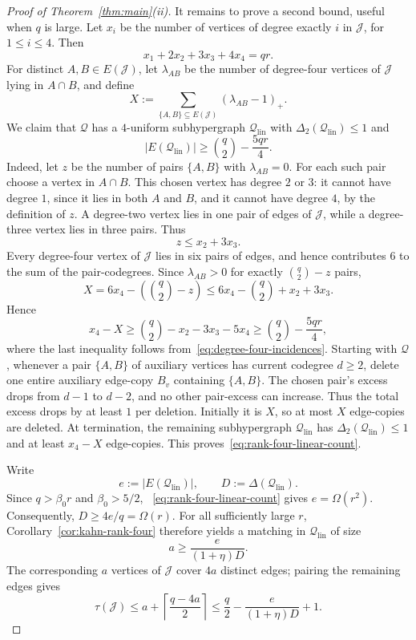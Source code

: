 \documentclass[10pt,a4paper]{amsart}
\newcommand{\Del}{\Delta}
\newcommand{\DelTwo}{\Delta_2}
\newcommand{\cJ}{\mathcal J}
\newcommand{\cQ}{\mathcal Q}
\newcommand{\cQlin}{\mathcal Q_{\mathrm{lin}}}
\newcommand{\ta}{\tau}
\begin{document}
\begin{proof}[Proof of Theorem~\ref{thm:main}(ii)]
It remains to prove a second bound, useful when $q$ is large.  Let $x_i$ be
the number of vertices of degree exactly $i$ in $\cJ$, for $1\le i\le 4$.
Then
\begin{equation}\label{eq:degree-four-incidences}
  x_1+2x_2+3x_3+4x_4=qr.
\end{equation}
For distinct $A,B\in E(\cJ)$, let $\lambda_{AB}$ be the number of
degree-four vertices of $\cJ$ lying in $A\cap B$, and define
\[
  X:=\sum_{\{A,B\}\subseteq E(\cJ)}(\lambda_{AB}-1)_+.
\]
We claim that $\cQ$ has a $4$-uniform subhypergraph $\cQlin$ with
$\DelTwo(\cQlin)\le 1$ and
\begin{equation}\label{eq:rank-four-linear-count}
  |E(\cQlin)|\ge \binom q2-\frac{5qr}{4}.
\end{equation}
Indeed, let $z$ be the number of pairs $\{A,B\}$ with $\lambda_{AB}=0$.
For each such pair choose a vertex in $A\cap B$.  This chosen vertex has
degree $2$ or $3$: it cannot have degree $1$, since it lies in both $A$ and
$B$, and it cannot have degree $4$, by the definition of $z$.  A degree-two
vertex lies in one pair of edges of $\cJ$, while a degree-three vertex lies in
three pairs.  Thus
\[
  z\le x_2+3x_3.
\]
Every degree-four vertex of $\cJ$ lies in six pairs of edges, and hence
contributes $6$ to the sum of the pair-codegrees.  Since $\lambda_{AB}>0$
for exactly $\binom q2-z$ pairs,
\[
  X
  =6x_4-\left(\binom q2-z\right)
  \le 6x_4-\binom q2+x_2+3x_3.
\]
Hence
\[
  x_4-X\ge \binom q2-x_2-3x_3-5x_4
  \ge \binom q2-\frac{5qr}{4},
\]
where the last inequality follows from~\eqref{eq:degree-four-incidences}.
Starting with $\cQ$, whenever a pair $\{A,B\}$ of auxiliary vertices has
current codegree $d\ge2$, delete one entire auxiliary edge-copy $B_v$
containing $\{A,B\}$.  The chosen pair's excess drops from $d-1$ to $d-2$,
and no other pair-excess can increase.  Thus the total excess drops by at
least $1$ per deletion.  Initially it is $X$, so at most $X$ edge-copies are
deleted.  At termination, the remaining subhypergraph $\cQlin$ has
$\DelTwo(\cQlin)\le1$ and at least $x_4-X$ edge-copies.  This
proves~\eqref{eq:rank-four-linear-count}.

Write
\[
  e:=|E(\cQlin)|,\qquad D:=\Del(\cQlin).
\]
Since $q>\beta_0r$ and $\beta_0>5/2$,
~\eqref{eq:rank-four-linear-count} gives $e=\Omega(r^2)$.
Consequently, $D\ge 4e/q=\Omega(r)$.  For all sufficiently large $r$,
Corollary~\ref{cor:kahn-rank-four} therefore yields a matching in $\cQlin$
of size
\[
  a\ge \frac{e}{(1+\eta)D}.
\]
The corresponding $a$ vertices of $\cJ$ cover $4a$ distinct edges; pairing
the remaining edges gives
\[
  \ta(\cJ)
  \le a+\left\lceil\frac{q-4a}{2}\right\rceil
  \le \frac q2-\frac{e}{(1+\eta)D}+1.
\]


\end{proof}
\end{document}
